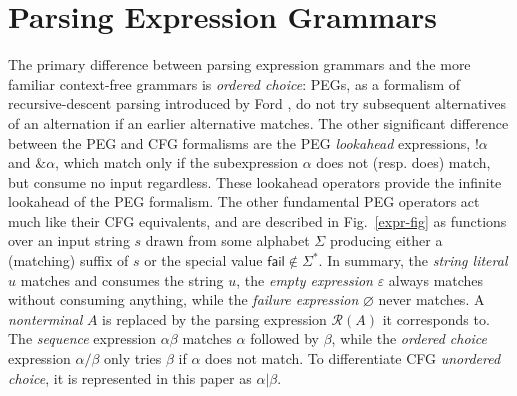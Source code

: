 \documentclass{article}
\newcommand{\Rule}{\mathcal{R}}
\newcommand{\fail}{\mathsf{fail}}
\newcommand{\nl}{\mathord{!}}
\begin{document}
\section{Parsing Expression Grammars}
The primary difference between parsing expression grammars and the more familiar context-free grammars is \emph{ordered choice}: PEGs, as a formalism of recursive-descent parsing introduced by Ford \cite{For02}, do not try subsequent alternatives of an alternation if an earlier alternative matches. 
The other significant difference between the PEG and CFG formalisms are the PEG \emph{lookahead} expressions, $\nl\alpha$ and $\&\alpha$, which match only if the subexpression $\alpha$ does not (resp. does) match, but consume no input regardless. 
These lookahead operators provide the infinite lookahead of the PEG formalism.
The other fundamental PEG operators act much like their CFG equivalents, and are described in Fig.~\ref{expr-fig} as functions over an input string $s$ drawn from some alphabet $\Sigma$ producing either a (matching) suffix of $s$ or the special value $\fail \not\in \Sigma^*$.
In summary, the \emph{string literal} $u$ matches and consumes the string $u$, the \emph{empty expression} $\varepsilon$ always matches without consuming anything, while the \emph{failure expression} $\varnothing$ never matches. 
A \emph{nonterminal} $A$ is replaced by the parsing expression $\Rule(A)$ it corresponds to.
The \emph{sequence} expression $\alpha\beta$ matches $\alpha$ followed by $\beta$, while the \emph{ordered choice} expression $\alpha/\beta$ only tries $\beta$ if $\alpha$ does not match. 
To differentiate CFG \emph{unordered choice}, it is represented in this paper as $\alpha|\beta$.
\end{document}
